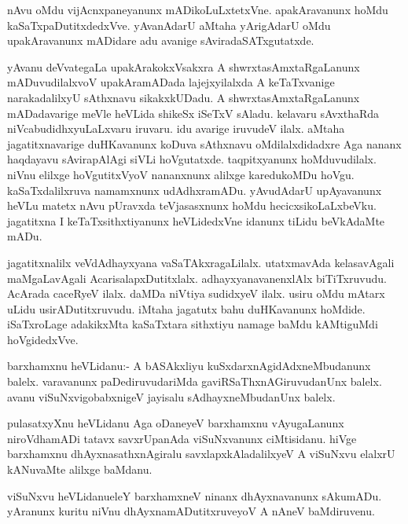 \begin{mng}
nAvu oMdu vijAcnxpaneyanunx mADikoLuLxtetxVne. apakAravanunx hoMdu kaSaTxpaDutitxdedxVve. yAvanAdarU aMtaha yArigAdarU oMdu upakAravanunx mADidare adu avanige sAviradaSATxgutatxde.
\end{mng}

\begin{mng}
yAvanu deVvategaLa upakArakokxVsakxra A shwrxtasAmxtaRgaLanunx mADuvudilalxvoV upakAramADada lajejxyilalxda A keTaTxvanige narakadalilxyU sAthxnavu sikakxkUDadu. A shwrxtasAmxtaRgaLanunx mADadavarige meVle heVLida shikeSx iSeTxV sAladu. kelavaru sAvxthaRda niVcabudidhxyuLaLxvaru iruvaru. idu avarige iruvudeV ilalx. aMtaha jagatitxnavarige duHKavanunx koDuva sAthxnavu oMdilalxdidadxre Aga nananx haqdayavu sAvirapAlAgi siVLi hoVgutatxde. taqpitxyanunx hoMduvudilalx. niVnu elilxge hoVgutitxVyoV nananxnunx alilxge karedukoMDu hoVgu. kaSaTxdalilxruva namamxnunx udAdhxramADu. yAvudAdarU upAyavanunx heVLu matetx nAvu pUravxda teVjasasxnunx hoMdu hecicxsikoLaLxbeVku. jagatitxna I keTaTxsithxtiyanunx heVLidedxVne idanunx tiLidu beVkAdaMte mADu. 
\end{mng}

\begin{mng}
jagatitxnalilx veVdAdhayxyana vaSaTAkxragaLilalx. utatxmavAda kelasavAgali maMgaLavAgali AcarisalapxDutitxlalx. adhayxyanavanenxlAlx biTiTxruvudu. AcArada caceRyeV ilalx. daMDa niVtiya sudidxyeV ilalx. usiru oMdu mAtarx uLidu usirADutitxruvudu. iMtaha jagatutx bahu duHKavanunx hoMdide. iSaTxroLage adakikxMta kaSaTxtara sithxtiyu namage baMdu kAMtiguMdi hoVgidedxVve.
\end{mng}

\begin{mng}
barxhamxnu heVLidanu:- A bASAkxliyu kuSxdarxnAgidAdxneMbudanunx balelx. varavanunx paDediruvudariMda gaviRSaThxnAGiruvudanUnx balelx. avanu viSuNxvigobabxnigeV jayisalu sAdhayxneMbudanUnx balelx.
\end{mng}

\begin{mng}
pulasatxyXnu heVLidanu Aga oDaneyeV barxhamxnu vAyugaLanunx niroVdhamADi tatavx savxrUpanAda viSuNxvanunx ciMtisidanu. hiVge barxhamxnu dhAyxnasathxnAgiralu savxlapxkAladalilxyeV A viSuNxvu elalxrU kANuvaMte alilxge baMdanu.
\end{mng}

\begin{mng}
viSuNxvu heVLidanu\mdash eleY barxhamxneV ninanx dhAyxnavanunx sAkumADu. yAranunx kuritu niVnu dhAyxnamADutitxruveyoV A nAneV baMdiruvenu.
\end{mng}

